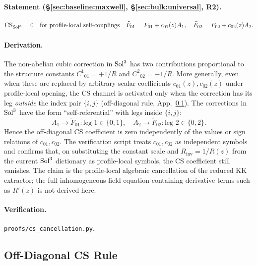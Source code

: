 \paragraph{Statement (\S\ref{sec:baseline:maxwell}, \S\ref{sec:bulk:universal}, R2).}
\begin{equation}
  \mathrm{CS}_{\mathrm{Sol}^3} = 0 \quad
  \text{for profile-local self-couplings}\quad
  \tilde{F}_{01} = F_{01} + c_{01}(z) A_1,
  \quad
  \tilde{F}_{02} = F_{02} + c_{02}(z) A_2.
\end{equation}

\paragraph{Derivation.}
The non-abelian cubic correction in $\mathrm{Sol}^3$ has two contributions
proportional to the structure constants $C^1{}_{01} = +1/R$ and
$C^2{}_{02} = -1/R$.  More generally, even when these are replaced by
arbitrary scalar coefficients $c_{01}(z), c_{02}(z)$ under profile-local
opening, the CS channel is activated only when the correction has its leg
\emph{outside} the index pair $\{i,j\}$ (off-diagonal rule, App.~\ref{app:E:E4}).
The corrections in $\mathrm{Sol}^3$ have the form ``self-referential'' with
legs inside $\{i,j\}$:
\begin{equation}
  A_1\to\tilde{F}_{01}: \text{leg } 1\in\{0,1\},\quad
  A_2\to\tilde{F}_{02}: \text{leg } 2\in\{0,2\}.
\end{equation}
Hence the off-diagonal CS coefficient is zero independently of the values or
sign relations of $c_{01}, c_{02}$.  The verification script treats
$c_{01}, c_{02}$ as independent symbols and confirms that, on substituting
the constant scale and $R_{\mathrm{inv}} = 1/R(z)$ from the current
$\mathrm{Sol}^3$ dictionary as profile-local symbols, the CS coefficient still
vanishes.  The claim is the profile-local algebraic cancellation of the
reduced KK extractor; the full inhomogeneous field equation containing
derivative terms such as $R'(z)$ is not derived here.

\paragraph{Verification.}
\texttt{proofs/cs\_cancellation.py}.

\subsection{Off-Diagonal CS Rule}
\label{app:E:E4}

